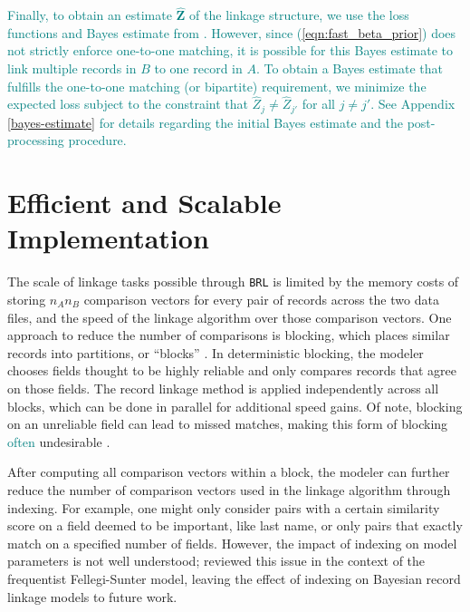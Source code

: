 \documentclass[ba]{imsart}
\begin{document}

\textcolor{teal}{Finally, to obtain an estimate $\hat{\bm{Z}}$ of the linkage structure, we use the loss functions and Bayes estimate from \cite{sadinle_bayesian_2017}. However, since (\ref{eqn:fast_beta_prior}) does not strictly enforce one-to-one matching, it is possible for this Bayes estimate to link multiple records in $B$ to one record in $A$. To obtain a Bayes estimate that fulfills the one-to-one matching (or bipartite) requirement, we minimize the expected loss subject to the constraint that $\hat{Z}_j \neq \hat{Z}_{j'}$ for all $j \neq j'$. See Appendix \ref{bayes-estimate} for details regarding the initial Bayes estimate and the post-processing procedure.}


\section{Efficient and Scalable Implementation}
\label{sec:efficiency}

The scale of linkage tasks possible through \texttt{BRL} is limited by the memory costs of storing $n_A  n_B$ comparison vectors for every pair of records across the two data files, and the speed of the linkage algorithm over those comparison vectors. One approach to reduce the number of comparisons is blocking, which places similar records into partitions, or ``blocks'' \citep{christen2019data}. In deterministic blocking, the modeler chooses fields thought to be highly reliable and only compares records that agree on those fields. The record linkage method is  applied independently across all blocks, which can be done in parallel for additional speed gains. Of note, blocking on an unreliable field can lead to missed matches, making this form of blocking \textcolor{teal}{often}
 undesirable %
\citep{steorts_comparison_2014}.

After computing all comparison vectors within a block, the modeler can further reduce the number of comparison vectors used in the linkage algorithm through indexing. For example, one might only consider pairs with a certain similarity score on a field deemed to be important, like last name, or only pairs that exactly match on a specified number of fields. However, the impact of indexing on model parameters is not well understood; \citep{murray2016probabilistic} reviewed this issue in the context of the frequentist Fellegi-Sunter model, leaving the effect of indexing on Bayesian record linkage models to future work.
\end{document}
